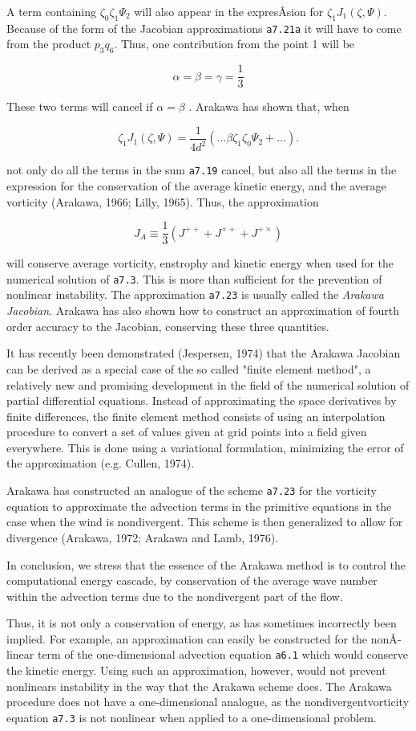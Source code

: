 A term containing \(\zeta_{0}\zeta_{1}\Psi_{2}\) will also appear in the
expresÂ­sion for \(\zeta_{1}J_{1}\left( \zeta,\Psi \right)\). Because of
the form of the Jacobian approximations \texttt{a7.21a} it will have to
come from the product \(p_{3}q_{6}\). Thus, one contribution from the
point 1 will be

\[\alpha = \beta = \gamma = \frac{1}{3}\]

These two terms will cancel if \(\alpha = \beta\) . Arakawa has shown
that, when

\[\zeta_{1}J_{1}\left( \zeta,\Psi \right) = \frac{1}{4d^{2}}\left( \ldots\beta\zeta_{1}\zeta_{0}\Psi_{2} + \ldots \right).\]

not only do all the terms in the sum \texttt{a7.19} cancel, but also all
the terms in the expression for the conservation of the average kinetic
energy, and the average vorticity (Arakawa, 1966; Lilly, 1965). Thus,
the approximation

{\[J_{A} \equiv \frac{1}{3}\left( J^{+ +} + J^{\times +} + J^{+ \times} \right)\]}

will conserve average vorticity, enstrophy and kinetic energy when used
for the numerical solution of \texttt{a7.3}. This is more than
sufficient for the prevention of nonlinear instability. The
approximation \texttt{a7.23} is usually called the \emph{Arakawa
Jacobian}. Arakawa has also shown how to construct an approximation of
fourth order accuracy to the Jacobian, conserving these three
quantities.

It has recently been demonstrated (Jespersen, 1974) that the Arakawa
Jacobian can be derived as a special case of the so called "finite
element method", a relatively new and promising development in the field
of the numerical solution of partial differential equations. Instead of
approximating the space derivatives by finite differences, the finite
element method consists of using an interpolation procedure to convert a
set of values given at grid points into a field given everywhere. This
is done using a variational formulation, minimizing the error of the
approximation (e.g. Cullen, 1974).

Arakawa has constructed an analogue of the scheme \texttt{a7.23} for the
vorticity equation to approximate the advection terms in the primitive
equations in the case when the wind is nondivergent. This scheme is then
generalized to allow for divergence (Arakawa, 1972; Arakawa and Lamb,
1976).

In conclusion, we stress that the essence of the Arakawa method is to
control the computational energy cascade, by conservation of the average
wave number within the advection terms due to the nondivergent part of
the flow.

Thus, it is not only a conservation of energy, as has sometimes
incorrectly been implied. For example, an approximation can easily be
constructed for the nonÂ­linear term of the one-dimensional advection
equation \texttt{a6.1} which would conserve the kinetic energy. Using
such an approximation, however, would not prevent nonlinears instability
in the way that the Arakawa scheme does. The Arakawa procedure does not
have a one-dimensional analogue, as the nondivergentvorticity equation
\texttt{a7.3} is not nonlinear when applied to a one-dimensional
problem.